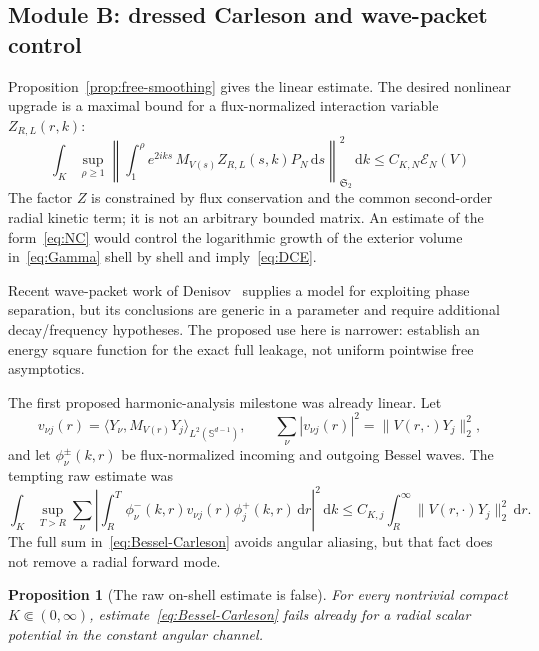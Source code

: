 \documentclass[11pt]{article}
\newcommand{\Sd}{\mathbb S^{d-1}}
\newcommand{\cE}{\mathcal E}
\newcommand{\HS}{\mathfrak S_2}
\newcommand{\dd}{\,\mathrm d}
\newtheorem{proposition}[theorem]{Proposition}
\theoremstyle{definition}
\theoremstyle{remark}
\begin{document}
\subsection{Module B: dressed Carleson and wave-packet control}

Proposition~\ref{prop:free-smoothing} gives the linear estimate.  The desired nonlinear upgrade is a maximal bound for a flux-normalized interaction variable $Z_{R,L}(r,k)$:
\begin{equation}
 \int_K\sup_{\rho\geq1}
 \left\|
  \int_1^\rho e^{2iks}\,M_{V(s)}Z_{R,L}(s,k)P_N\dd s
 \right\|_{\HS}^2\dd k
 \leq C_{K,N}\cE_N(V)
 \label{eq:NC}
\end{equation}
The factor $Z$ is constrained by flux conservation and the common second-order radial kinetic term; it is not an arbitrary bounded matrix.  An estimate of the form~\eqref{eq:NC} would control the logarithmic growth of the exterior volume in~\eqref{eq:Gamma} shell by shell and imply~\eqref{eq:DCE}.

Recent wave-packet work of Denisov~\cite{Denisov2025} supplies a model for exploiting phase separation, but its conclusions are generic in a parameter and require additional decay/frequency hypotheses.  The proposed use here is narrower: establish an energy square function for the exact full leakage, not uniform pointwise free asymptotics.

The first proposed harmonic-analysis milestone was already linear.  Let
\begin{equation}
 v_{\nu j}(r)=\langle Y_\nu,M_{V(r)}Y_j\rangle_{L^2(\Sd)},
 \qquad
 \sum_\nu|v_{\nu j}(r)|^2=\|V(r,\cdot)Y_j\|_2^2,
 \label{eq:parseval-column}
\end{equation}
and let $\phi_\nu^\pm(k,r)$ be flux-normalized incoming and outgoing Bessel waves.  The tempting raw estimate was
\begin{equation}
 \int_K\sup_{T>R}\sum_\nu
 \left|
  \int_R^T
  \phi_\nu^-(k,r)v_{\nu j}(r)\phi_j^+(k,r)\dd r
 \right|^2\dd k
 \leq C_{K,j}\int_R^\infty\|V(r,\cdot)Y_j\|_2^2\dd r.
 \label{eq:Bessel-Carleson}
\end{equation}
The full sum in~\eqref{eq:Bessel-Carleson} avoids angular aliasing, but that fact does not remove a radial forward mode.

\begin{proposition}[The raw on-shell estimate is false]\label{prop:raw-bessel-false}
For every nontrivial compact $K\Subset(0,\infty)$, estimate~\eqref{eq:Bessel-Carleson} fails already for a radial scalar potential in the constant angular channel.
\end{proposition}
\end{document}

